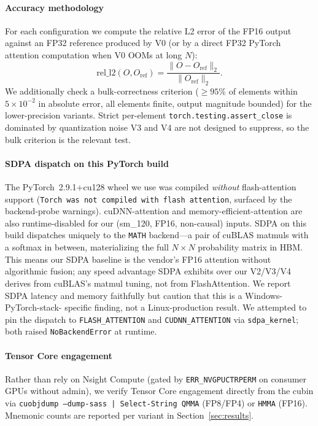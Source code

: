 \documentclass[conference]{IEEEtran}
\begin{document}
\paragraph*{Accuracy methodology} For each configuration we compute
the relative L2 error of the FP16 output against an FP32 reference
produced by V0 (or by a direct FP32 PyTorch attention computation
when V0 OOMs at long $N$):
\begin{equation}
  \mathrm{rel\_l2}(O, O_{\mathrm{ref}}) =
  \frac{\| O - O_{\mathrm{ref}} \|_2}{\| O_{\mathrm{ref}} \|_2}.
\end{equation}
We additionally check a bulk-correctness criterion ($\geq 95\%$ of
elements within $5\times 10^{-2}$ in absolute error, all elements
finite, output magnitude bounded) for the lower-precision variants.
Strict per-element \texttt{torch.testing.assert\_close} is dominated
by quantization noise V3 and V4 are not designed to suppress, so
the bulk criterion is the relevant test.

\paragraph*{SDPA dispatch on this PyTorch build}
The PyTorch~2.9.1+cu128 wheel we use was compiled \emph{without}
flash-attention support (\texttt{Torch was not compiled with flash
attention}, surfaced by the backend-probe warnings). cuDNN-attention
and memory-efficient-attention are also runtime-disabled for our
(sm\_120, FP16, non-causal) inputs. SDPA on this build dispatches
uniquely to the \texttt{MATH} backend---a pair of cuBLAS matmuls
with a softmax in between, materializing the full $N \times N$
probability matrix in HBM. This means our SDPA baseline is the
vendor's FP16 attention without algorithmic fusion; any speed
advantage SDPA exhibits over our V2/V3/V4 derives from cuBLAS's
matmul tuning, not from FlashAttention. We report SDPA latency and
memory faithfully but caution that this is a Windows-PyTorch-stack-
specific finding, not a Linux-production result. We attempted to
pin the dispatch to \texttt{FLASH\_ATTENTION} and
\texttt{CUDNN\_ATTENTION} via \texttt{sdpa\_kernel}; both raised
\texttt{NoBackendError} at runtime.

\paragraph*{Tensor Core engagement} Rather than rely on Nsight
Compute (gated by \texttt{ERR\_NVGPUCTRPERM} on consumer GPUs
without admin), we verify Tensor Core engagement directly from the
cubin via \texttt{cuobjdump --dump-sass | Select-String QMMA}
(FP8/FP4) or \texttt{HMMA} (FP16). Mnemonic counts are reported per
variant in Section~\ref{sec:results}.
\end{document}
